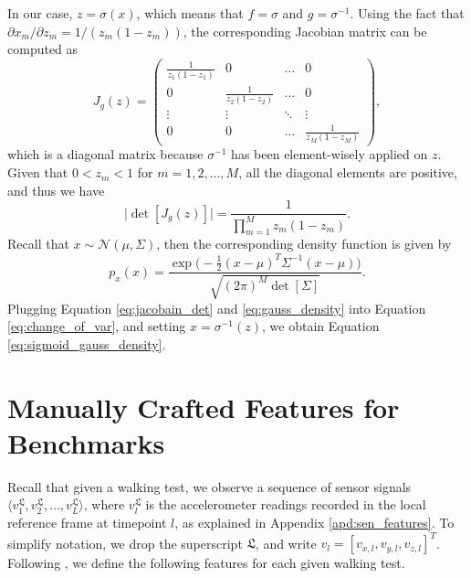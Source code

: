 \documentclass[mnsc]{informs3b} %
\begin{document}
\begin{appendices}
In our case, $z=\sigma(x)$, which means that $f=\sigma$ and $g=\sigma^{-1}$. Using the fact that $\partial x_m/\partial z_m = 1 / (z_m(1-z_m))$, the corresponding Jacobian matrix can be computed as
\begin{equation}
J_{g}(z) =  \begin{pmatrix}
    \frac{1}{z_1 (1-z_1)} & 0 & \dots & 0 \\
    0 & \frac{1}{z_2 (1-z_2)} & \dots & 0 \\
    \vdots & \vdots & \ddots & \vdots \\
    0 & 0 & \dots & \frac{1}{z_M (1-z_M)}
  \end{pmatrix},
\end{equation}
which is a diagonal matrix because $\sigma^{-1}$ has been element-wisely applied on $z$. Given that $0< z_m < 1$ for $m=1,2,\dots,M$, all the diagonal elements are positive, and thus we have 
\begin{equation}
\label{eq:jacobain_det}
   \big| \det[J_g(z)] \big|  = \frac{1}{\prod_{m=1}^{M} z_{m}(1-z_{m})}.
\end{equation}
Recall that $x \sim \mathcal{N}(\mu, \Sigma)$, then the corresponding density function is given by 
\begin{equation}
\label{eq:gauss_density}
p_x(x) = \frac {\exp \big(-\frac{1}{2}(x-\mu)^{T}{\Sigma}^{-1}(x-\mu) \big)}{ \sqrt{(2 \pi)^{M} \det[\Sigma] }}.
\end{equation}
Plugging Equation \ref{eq:jacobain_det} and \ref{eq:gauss_density} into Equation \ref{eq:change_of_var}, and setting $x=\sigma^{-1}(z)$, we obtain Equation \ref{eq:sigmoid_gauss_density}.

\clearpage

\section{Manually Crafted Features for Benchmarks}\label{apd:mannual_features}

Recall that given a walking test, we observe a sequence of sensor signals $\langle v_1^{\mathfrak{L}}, v_2^{\mathfrak{L}}, \dots, v_L^{\mathfrak{L}} \rangle$, where $v_l^{\mathfrak{L}}$ is the accelerometer readings recorded in the local reference frame at timepoint $l$, as explained in Appendix \ref{apd:sen_features}. To simplify notation, we drop the superscript $\mathfrak{L}$, and write $v_l=[v_{x,l},v_{y,l},v_{z,l}]^T$.
Following , we define the following features for each given walking test. 


\end{appendices}
\end{document}
